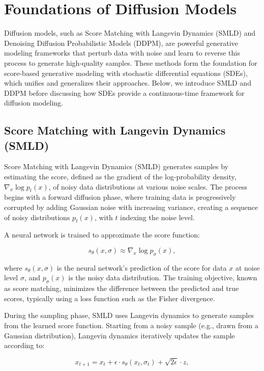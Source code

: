 \documentclass[12pt]{article}
\begin{document}
\section{Foundations of Diffusion Models}

Diffusion models, such as Score Matching with Langevin Dynamics (SMLD) and Denoising Diffusion Probabilistic Models (DDPM), are powerful generative modeling frameworks that perturb data with noise and learn to reverse this process to generate high-quality samples. These methods form the foundation for score-based generative modeling with stochastic differential equations (SDEs), which unifies and generalizes their approaches. Below, we introduce SMLD and DDPM before discussing how SDEs provide a continuous-time framework for diffusion modeling.

\subsection{Score Matching with Langevin Dynamics (SMLD)}

Score Matching with Langevin Dynamics (SMLD) generates samples by estimating the score, defined as the gradient of the log-probability density, $\nabla_x \log p_t(x)$, of noisy data distributions at various noise scales. The process begins with a forward diffusion phase, where training data is progressively corrupted by adding Gaussian noise with increasing variance, creating a sequence of noisy distributions $p_t(x)$, with $t$ indexing the noise level.

A neural network is trained to approximate the score function:

\begin{equation}
    s_\theta(x, \sigma) \approx \nabla_x \log p_\sigma(x),
\end{equation}

where $s_\theta(x, \sigma)$ is the neural network’s prediction of the score for data $x$ at noise level $\sigma$, and $p_\sigma(x)$ is the noisy data distribution. The training objective, known as score matching, minimizes the difference between the predicted and true scores, typically using a loss function such as the Fisher divergence.

During the sampling phase, SMLD uses Langevin dynamics to generate samples from the learned score function. Starting from a noisy sample (e.g., drawn from a Gaussian distribution), Langevin dynamics iteratively updates the sample according to:

\begin{equation}
    x_{t+1} = x_t + \epsilon \cdot s_\theta(x_t, \sigma_t) + \sqrt{2\epsilon} \cdot z,
\end{equation}
\end{document}
